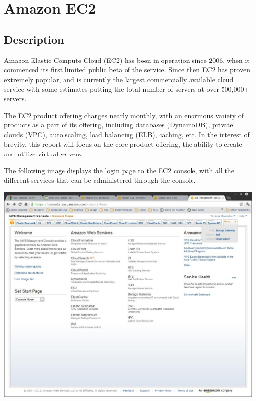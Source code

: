 \chapter{Amazon EC2}
\section{Description}
Amazon Elastic Compute Cloud (EC2) has been in operation since 2006\ftAmOne, when it commenced its first limited public beta of the service. Since then EC2 has proven extremely popular, and is currently the largest commercially available cloud service with some estimates putting the total number of servers at over 500,000+ servers\ftAmTwo.\ftAmOneText\ftAmTwoText

The EC2 product offering changes nearly monthly, with an enormous variety of products as a part of its offering, including databases (DynamoDB), private clouds (VPC), auto scaling, load balancing (ELB), caching, etc. In the interest of brevity, this report will focus on the core product offering, the ability to create and utilize virtual servers.

The following image displays the login page to the EC2 console, with all the different services that can be administered through the console.

\begin{center}
\includegraphics[scale=0.3]{figs/EC2console.jpg}
\end{center}

